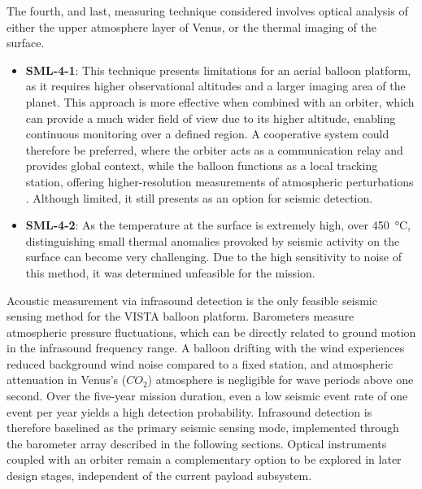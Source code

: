 The fourth, and last, measuring technique considered involves optical analysis of either the upper atmosphere layer of Venus, or the thermal imaging of the surface. 

\begin{itemize}
    \item \textbf{SML-4-1}: This technique presents limitations for an aerial balloon platform, as it requires higher observational altitudes and a larger imaging area of the planet. This approach is more effective when combined with an orbiter, which can provide a much wider field of view due to its higher altitude, enabling continuous monitoring over a defined region. A cooperative system could therefore be preferred, where the orbiter acts as a communication relay and provides global context, while the balloon functions as a local tracking station, offering higher-resolution measurements of atmospheric perturbations \cite{seism1}. Although limited, it still presents as an option for seismic detection.
    \item \textbf{SML-4-2}: As the temperature at the surface is extremely high, over \SI{450}{\celsius}, distinguishing small thermal anomalies provoked by seismic activity on the surface can become very challenging. Due to the high sensitivity to noise of this method, it was determined unfeasible for the mission.
\end{itemize}

Acoustic measurement via infrasound detection is the only feasible seismic sensing method for the VISTA balloon platform. Barometers measure atmospheric pressure fluctuations, which can be directly related to ground motion in the infrasound frequency range. A balloon drifting with the wind experiences reduced background wind noise compared to a fixed station, and atmospheric attenuation in Venus's ($CO_2$) atmosphere is negligible for wave periods above one second. Over the five-year mission duration, even a low seismic event rate of one event per year yields a high detection probability. Infrasound detection is therefore baselined as the primary seismic sensing mode, implemented through the barometer array described in the following sections. Optical instruments coupled with an orbiter remain a complementary option to be explored in later design stages, independent of the current payload subsystem.



